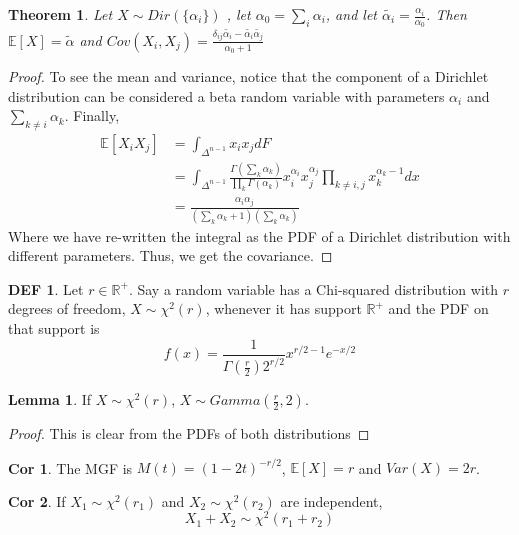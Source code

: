 \documentclass{article}
\newtheorem{theorem}{Theorem}
\theoremstyle{definition}\newtheorem{definition}{DEF}
\theoremstyle{definition}\newtheorem{example}{Ex}
\theoremstyle{lemma}\newtheorem{lemma}{Lemma}
\theoremstyle{corrolary}\newtheorem{corrolary}{Cor}
\begin{document}
\begin{theorem}
Let $X\sim Dir(\{\alpha_i \})$ , let $\alpha_0 =\sum_i \alpha_i$, and let $\tilde{\alpha_i} = \frac{\alpha_i}{\alpha_0}$.
Then $\mathbb{E}[X]=\tilde{\alpha}$ and $Cov(X_i, X_j)=\frac{\delta_{ij}\tilde{\alpha_i} - \tilde{\alpha_i}\tilde{\alpha_j}}{\alpha_0 +1}$
\end{theorem}
\begin{proof}
To see the mean and variance, notice that the component of a Dirichlet distribution can be considered a beta random variable with parameters $\alpha_i$ and $\sum_{k\neq i}\alpha_k$.
Finally,
\begin{align*}
\mathbb{E}[X_i X_j]&=\int_{\Delta^{n-1}}x_i x_j dF\\
&=\int_{\Delta^{n-1}} \frac{\Gamma(\sum_k \alpha_k)}{\prod_k \Gamma(\alpha_k)} x_i^{\alpha_i} x_j^{\alpha_j} \prod_{k\neq i,j} x_k^{\alpha_k-1}dx\\
&=\frac{\alpha_i \alpha_j}{(\sum_k \alpha_k +1)(\sum_k \alpha_k)}
\end{align*}
Where we have re-written the integral as the PDF of a Dirichlet distribution with different parameters.
Thus, we get the covariance.
\end{proof}

\begin{definition}
Let $r\in\mathbb{R}^+$.
Say a random variable has a Chi-squared distribution with $r$ degrees of freedom, $X\sim \chi^2(r)$, whenever it has support $\mathbb{R}^+$ and the PDF on that support is
\begin{equation}
f(x)=\frac{1}{\Gamma(\frac{r}{2})2^{r/2}}x^{{r/2}-1}e^{-x/2}
\end{equation}
\end{definition}

\begin{lemma}
If $X\sim \chi^2(r)$, $X\sim Gamma(\frac{r}{2},2)$.
\end{lemma}
\begin{proof}
This is clear from the PDFs of both distributions
\end{proof}
\begin{corrolary}
The MGF is $M(t)=(1-2t)^{-r/2}$, $\mathbb{E}[X]=r$ and $Var(X)=2r$.
\end{corrolary}
\begin{corrolary}
If $X_1\sim \chi^2(r_1)$ and $X_2\sim \chi^2(r_2)$ are independent,
\begin{equation}
X_1 + X_2 \sim \chi^2 (r_1 + r_2)
\end{equation}
\end{corrolary}
\end{document}
